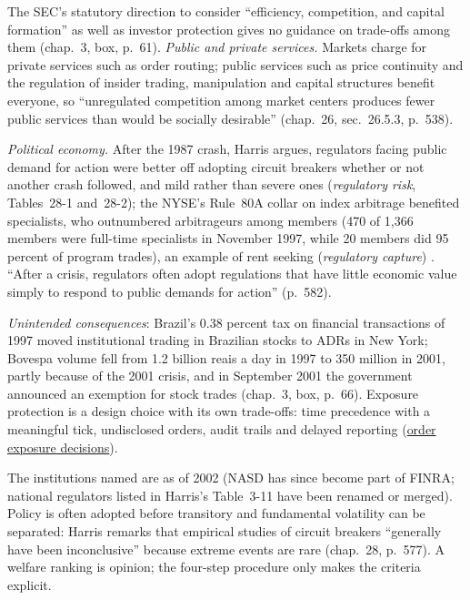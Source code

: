 \begin{qfdefinition}
The SEC's statutory direction to consider ``efficiency, competition, and capital formation'' as well as investor protection gives no guidance on trade-offs among them (chap.~3, box, p.~61). \emph{Public and private services.} Markets charge for private services such as order routing; public services such as price continuity and the regulation of insider trading, manipulation and capital structures benefit everyone, so ``unregulated competition among market centers produces fewer public services than would be socially desirable'' (chap.~26, sec.~26.5.3, p.~538).

 \emph{Political economy.} After the 1987 crash, Harris argues, regulators facing public demand for action were better off adopting circuit breakers whether or not another crash followed, and mild rather than severe ones (\emph{regulatory risk}, Tables~28-1 and~28-2); the NYSE's Rule~80A collar on index arbitrage benefited specialists, who outnumbered arbitrageurs among members (470 of 1{,}366 members were full-time specialists in November 1997, while 20 members did 95 percent of program trades), an example of rent seeking (\emph{regulatory capture}) \citep[chap.~28, sec.~28.4, pp.~578--581]{alpha-harris}. ``After a crisis, regulators often adopt regulations that have little economic value simply to respond to public demands for action'' (p.~582).

\emph{Unintended consequences}: Brazil's 0.38 percent tax on financial transactions of 1997 moved institutional trading in Brazilian stocks to ADRs in New York; Bovespa volume fell from 1.2 billion reais a day in 1997 to 350 million in 2001, partly because of the 2001 crisis, and in September 2001 the government announced an exemption for stock trades (chap.~3, box, p.~66). Exposure protection is a design choice with its own trade-offs: time precedence with a meaningful tick, undisclosed orders, audit trails and delayed reporting (\hyperref[def:order-exposure-decisions]{order exposure decisions}).

 The institutions named are as of 2002 (NASD has since become part of FINRA; national regulators listed in Harris's Table~3-11 have been renamed or merged). Policy is often adopted before transitory and fundamental volatility can be separated: Harris remarks that empirical studies of circuit breakers ``generally have been inconclusive'' because extreme events are rare (chap.~28, p.~577). A welfare ranking is opinion; the four-step procedure only makes the criteria explicit.


\end{qfdefinition}
